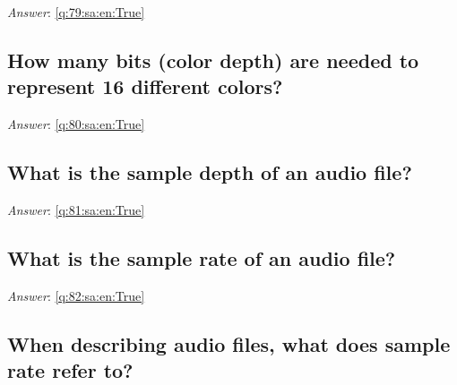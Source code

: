 \documentclass[a4paper,11pt,oneside]{article}
\begin{document}
\begin{sloppypar}
\vspace{1cm}

\textit{Answer}: \autoref{q:79:sa:en:True}



\subsection{How many bits (color depth) are needed to represent 16 different colors?}

\label{q:80:sa:en:False}

\vspace{2cm}

\noindent\makebox[\textwidth]{\hrulefill}

\vspace{1cm}

\textit{Answer}: \autoref{q:80:sa:en:True}



\subsection{What is the sample depth of an audio file?}

\label{q:81:sa:en:False}

\vspace{2cm}

\noindent\makebox[\textwidth]{\hrulefill}

\vspace{1cm}

\textit{Answer}: \autoref{q:81:sa:en:True}



\subsection{What is the sample rate of an audio file?}

\label{q:82:sa:en:False}

\vspace{2cm}

\noindent\makebox[\textwidth]{\hrulefill}

\vspace{1cm}

\textit{Answer}: \autoref{q:82:sa:en:True}



\subsection{When describing audio files, what does sample rate refer to?}


\end{sloppypar}
\end{document}
